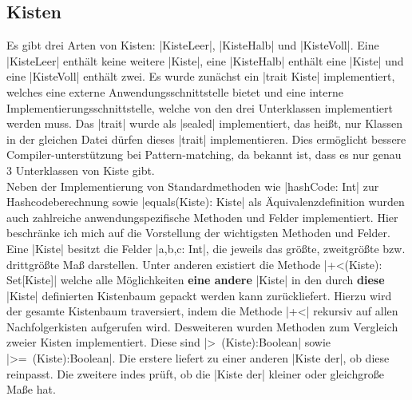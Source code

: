 \subsection{Kisten}
 Es gibt drei Arten von Kisten: |KisteLeer|, |KisteHalb| und |KisteVoll|.
 Eine |KisteLeer| enthält keine weitere |Kiste|, eine |KisteHalb| enthält eine |Kiste| und eine |KisteVoll| enthält zwei.
 Es wurde zunächst ein |trait Kiste| implementiert, welches eine externe Anwendungsschnittstelle bietet und eine interne Implementierungsschnittstelle,
 welche von den drei Unterklassen implementiert werden muss.
 Das |trait| wurde als |sealed| implementiert, das heißt, nur Klassen in der gleichen Datei dürfen dieses |trait| implementieren.
 Dies ermöglicht bessere Compiler-unterstützung bei Pattern-matching, da bekannt ist, dass es nur genau 3 Unterklassen von Kiste gibt. \\
 Neben der Implementierung von Standardmethoden wie |hashCode: Int| zur Hashcodeberechnung sowie |equals(Kiste): Kiste| als Äquivalenzdefinition
  wurden auch zahlreiche anwendungspezifische Methoden und Felder implementiert.
 Hier beschränke ich mich auf die Vorstellung der wichtigsten Methoden und Felder. \\
 Eine |Kiste| besitzt die Felder |a,b,c: Int|, die jeweils das größte, zweitgrößte bzw. drittgrößte Maß darstellen.
 Unter anderen existiert die Methode |+<(Kiste): Set[Kiste]| welche alle Möglichkeiten \textbf{eine andere} |Kiste| in den durch \textbf{diese} |Kiste| definierten Kistenbaum
  gepackt werden kann zurückliefert. Hierzu wird der gesamte Kistenbaum traversiert, indem die Methode |+<| rekursiv auf allen Nachfolgerkisten aufgerufen wird.
 Desweiteren wurden Methoden zum Vergleich zweier Kisten implementiert. Diese sind |>~(Kiste):Boolean| sowie |>=~(Kiste):Boolean|.
 Die erstere liefert zu einer anderen |Kiste der|, ob diese reinpasst. Die zweitere indes prüft, ob die |Kiste der| kleiner oder gleichgroße Maße hat.
